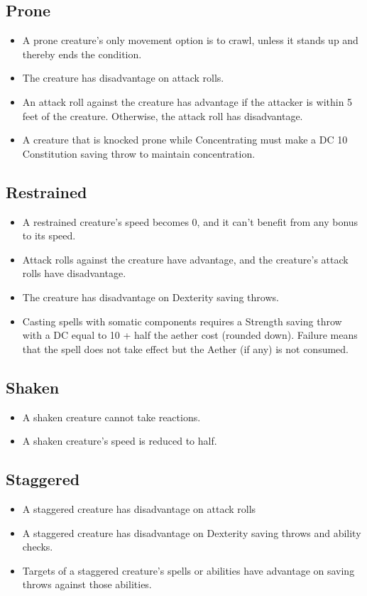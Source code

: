 \subsection{Prone\label{condition:prone}}
\begin{itemize}
\item A prone creature's only movement option is to crawl, unless it stands up and thereby ends the condition.
\item The creature has disadvantage on attack rolls.
\item An attack roll against the creature has advantage if the attacker is within 5 feet of the creature. Otherwise, the attack roll has disadvantage.
\item A creature that is knocked prone while Concentrating must make a DC 10 Constitution saving throw to maintain concentration.
\end{itemize}

\subsection{Restrained\label{condition:restrained}}
\begin{itemize}
\item A restrained creature's speed becomes 0, and it can't benefit from any bonus to its speed.
\item Attack rolls against the creature have advantage, and the creature's attack rolls have disadvantage.
\item The creature has disadvantage on Dexterity saving throws.
\item Casting spells with somatic components requires a Strength saving throw with a DC equal to 10 + half the aether cost (rounded down). Failure means that the spell does not take effect but the Aether (if any) is not consumed.
\end{itemize}

\subsection{Shaken\label{condition:shaken}}
\begin{itemize}
	\item A shaken creature cannot take reactions.
	\item A shaken creature's speed is reduced to half.
\end{itemize}

\subsection{Staggered\label{condition:staggered}}
\begin{itemize}
	\item A staggered creature has disadvantage on attack rolls 
	\item A staggered creature has disadvantage on Dexterity saving throws and ability checks.
	\item Targets of a staggered creature's spells or abilities have advantage on saving throws against those abilities.
\end{itemize}

